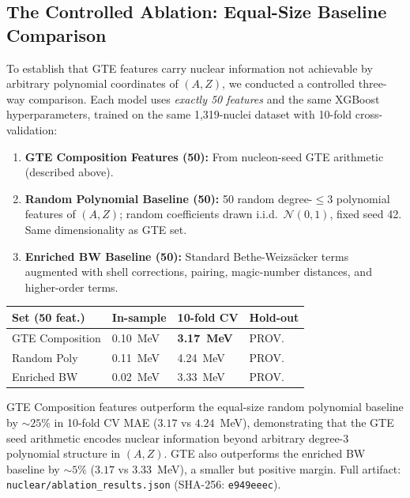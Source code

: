 \documentclass[9pt,twocolumn]{extarticle}
\begin{document}
\subsection{The Controlled Ablation: Equal-Size Baseline Comparison}
\label{sec:ablation}
To establish that GTE features carry nuclear information not achievable by arbitrary polynomial coordinates of $(A,Z)$, we conducted a controlled three-way comparison. Each model uses \emph{exactly 50 features} and the same XGBoost hyperparameters, trained on the same 1,319-nuclei dataset with 10-fold cross-validation:
\begin{enumerate}[leftmargin=1.2em,itemsep=0.2em]
    \item \textbf{GTE Composition Features (50):} From nucleon-seed GTE arithmetic (described above).
    \item \textbf{Random Polynomial Baseline (50):} 50 random degree-$\leq\!3$ polynomial features of $(A,Z)$; random coefficients drawn i.i.d.\ $\mathcal{N}(0,1)$, fixed seed 42. Same dimensionality as GTE set.
    \item \textbf{Enriched BW Baseline (50):} Standard Bethe-Weizsäcker terms augmented with shell corrections, pairing, magic-number distances, and higher-order terms.
\end{enumerate}

\begin{center}
\footnotesize
\begin{tabular}{@{}p{2.8cm}p{1.5cm}p{1.5cm}p{1.4cm}@{}}
\toprule
\textbf{Set (50 feat.)} & \textbf{In-sample} & \textbf{10-fold CV} & \textbf{Hold-out} \\
\midrule
GTE Composition & 0.10~MeV & \textbf{3.17~MeV} & PROV. \\
Random Poly     & 0.11~MeV & 4.24~MeV & PROV. \\
Enriched BW     & 0.02~MeV & 3.33~MeV & PROV. \\
\bottomrule
\end{tabular}
\end{center}

GTE Composition features outperform the equal-size random polynomial baseline by $\sim\!25\%$ in 10-fold CV MAE ($3.17$ vs $4.24$~MeV), demonstrating that the GTE seed arithmetic encodes nuclear information beyond arbitrary degree-3 polynomial structure in $(A,Z)$. GTE also outperforms the enriched BW baseline by $\sim\!5\%$ ($3.17$ vs $3.33$~MeV), a smaller but positive margin. Full artifact: \texttt{nuclear/ablation\_results.json} (SHA-256: \texttt{e949eeec}).
\end{document}
